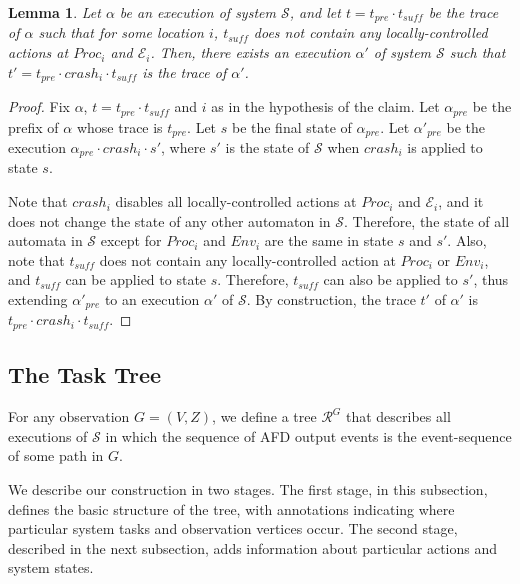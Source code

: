 \documentclass[11pt]{article}
\numberwithin{theorem}{section}
\newtheorem{lemma}[theorem]{Lemma}
\begin{document}
\begin{lemma}\label{lem:addCrashAfterLastEvent}
 Let $\alpha$ be an execution of system $\mathcal{S}$, and let $t = t_{pre} \cdot t_{suff}$ be the trace of $\alpha$ such that for some location $i$, $t_{suff}$ does not contain any locally-controlled actions at $Proc_i$ and $\mathcal{E}_i$. Then, there exists an execution $\alpha'$ of system $\mathcal{S}$ such that $t' = t_{pre} \cdot crash_i \cdot t_{suff}$ is the trace of $\alpha'$. 
\end{lemma}
\begin{proof}
Fix $\alpha$, $t= t_{pre} \cdot t_{suff}$ and $i$ as in the hypothesis of the claim.
Let $\alpha_{pre}$ be the prefix of $\alpha$ whose trace is $t_{pre}$. Let $s$ be the final state of $\alpha_{pre}$.
Let $\alpha'_{pre}$ be the execution $\alpha_{pre} \cdot crash_i \cdot s'$, where $s'$ is the state of $\mathcal{S}$ when $crash_i$ is applied to state $s$.

Note that $crash_i$ disables all locally-controlled actions at $Proc_i$ and $\mathcal{E}_i$, and it does not change the state of any other automaton in $\mathcal{S}$. Therefore, the state of all automata in $\mathcal{S}$ except for $Proc_i$ and $Env_i$ are the same in state $s$ and $s'$. Also, note that $t_{suff}$ does not contain any locally-controlled action at $Proc_i$ or $Env_i$, and $t_{suff}$ can be applied to state $s$. Therefore, $t_{suff}$ can also be applied to $s'$, thus extending $\alpha'_{pre}$ to an execution $\alpha'$ of $\mathcal{S}$. By construction, the trace $t'$ of $\alpha'$ is $t_{pre} \cdot crash_i \cdot t_{suff}$.
\end{proof}



\subsection{The Task Tree}\label{subsec:taskTree}
For any observation $G = (V,Z)$, we define a tree $\mathcal{R}^G$ that describes all executions of $\mathcal{S}$
in which the sequence of AFD output events is the event-sequence of
some path in $G$.





We describe our construction in two stages.
The first stage, in this subsection, defines the basic structure of
the tree, with annotations indicating where particular system tasks and
observation vertices occur.  
The second stage, described in the next subsection, adds information
about particular actions and system states.
\end{document}
